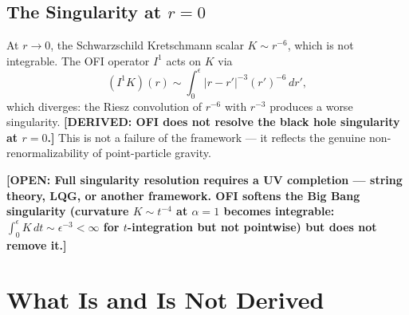\documentclass[12pt]{article}
\theoremstyle{definition}
\newcommand{\abs}[1]{\left|#1\right|}
\newcommand{\DERIVED}[1]{\textcolor{derivedcolor}{\textbf{[DERIVED: #1]}}}
\newcommand{\OPEN}[1]{\textcolor{opencolor}{\textbf{[OPEN: #1]}}}
\begin{document}
\subsection{The Singularity at $r=0$}

At $r \to 0$, the Schwarzschild Kretschmann scalar $K \sim r^{-6}$,
which is not integrable.  The OFI operator $I^1$ acts on $K$ via
\begin{equation}
  (I^1 K)(r) \sim \int_0^\epsilon \abs{r-r'}^{-3} (r')^{-6}\,dr',
\end{equation}
which diverges: the Riesz convolution of $r^{-6}$ with $r^{-3}$ produces
a worse singularity.  \DERIVED{OFI does not resolve the black hole singularity
at $r=0$.}  This is not a failure of the framework — it reflects the genuine
non-renormalizability of point-particle gravity.

\OPEN{Full singularity resolution requires a UV completion — string theory,
LQG, or another framework.  OFI softens the Big Bang singularity (curvature
$K \sim t^{-4}$ at $\alpha=1$ becomes integrable: $\int_0^\epsilon K\,dt
\sim \epsilon^{-3} < \infty$ for $t$-integration but not pointwise) but
does not remove it.}

\section{What Is and Is Not Derived}
\label{sec:summary}
\end{document}
